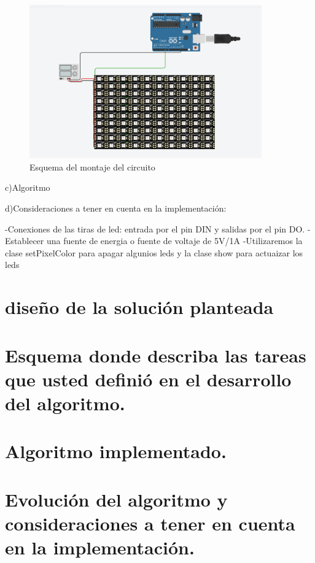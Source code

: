 \documentclass{article}
\begin{document}
\begin{figure}[ht]
\includegraphics[width=10cm]{Esquema.PNG}
\centering
\caption{Esquema del montaje del circuito}
\label{fig:Montaje}
\end{figure}

c)Algoritmo

d)Consideraciones a tener en cuenta en la implementación:

-Conexiones de las tiras de led: entrada por el pin DIN y salidas por el pin DO.
-Establecer una fuente de energia o  fuente de voltaje de 5V/1A
-Utilizaremos la clase setPixelColor para apagar algunios leds y la clase show para actuaizar los leds

\section{ diseño de la solución planteada }



\section{Esquema donde describa las tareas que usted definió en el desarrollo del algoritmo.}


\section{Algoritmo implementado.}



\section{Evolución del algoritmo y consideraciones a tener en cuenta en la implementación.
}
\end{document}
